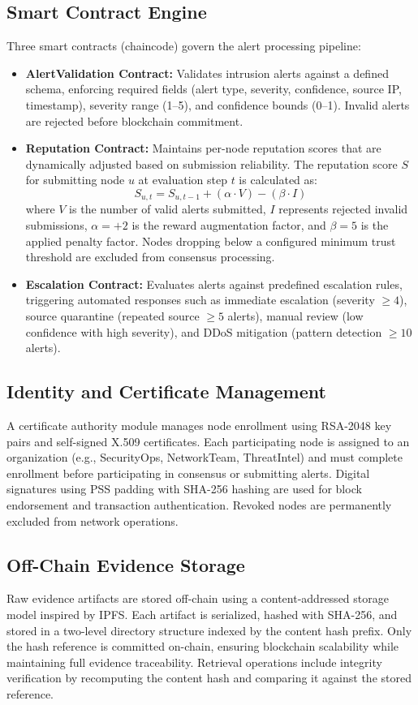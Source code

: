 \documentclass[conference]{IEEEtran}
\begin{document}
\subsection{Smart Contract Engine}
Three smart contracts (chaincode) govern the alert processing pipeline:
\begin{itemize}
    \item \textbf{AlertValidation Contract:} Validates intrusion alerts against a defined schema, enforcing required fields (alert type, severity, confidence, source IP, timestamp), severity range (1--5), and confidence bounds (0--1). Invalid alerts are rejected before blockchain commitment.
    \item \textbf{Reputation Contract:} Maintains per-node reputation scores that are dynamically adjusted based on submission reliability. The reputation score $S$ for submitting node $u$ at evaluation step $t$ is calculated as:
\begin{equation}
S_{u,t} = S_{u,t-1} + (\alpha \cdot V) - (\beta \cdot I)
\end{equation}
where $V$ is the number of valid alerts submitted, $I$ represents rejected invalid submissions, $\alpha = +2$ is the reward augmentation factor, and $\beta = 5$ is the applied penalty factor. Nodes dropping below a configured minimum trust threshold are excluded from consensus processing.
    \item \textbf{Escalation Contract:} Evaluates alerts against predefined escalation rules, triggering automated responses such as immediate escalation (severity $\geq 4$), source quarantine (repeated source $\geq 5$ alerts), manual review (low confidence with high severity), and DDoS mitigation (pattern detection $\geq 10$ alerts).
\end{itemize}

\subsection{Identity and Certificate Management}
A certificate authority module manages node enrollment using RSA-2048 key pairs and self-signed X.509 certificates. Each participating node is assigned to an organization (e.g., SecurityOps, NetworkTeam, ThreatIntel) and must complete enrollment before participating in consensus or submitting alerts. Digital signatures using PSS padding with SHA-256 hashing are used for block endorsement and transaction authentication. Revoked nodes are permanently excluded from network operations.

\subsection{Off-Chain Evidence Storage}
Raw evidence artifacts are stored off-chain using a content-addressed storage model inspired by IPFS. Each artifact is serialized, hashed with SHA-256, and stored in a two-level directory structure indexed by the content hash prefix. Only the hash reference is committed on-chain, ensuring blockchain scalability while maintaining full evidence traceability. Retrieval operations include integrity verification by recomputing the content hash and comparing it against the stored reference.
\end{document}

